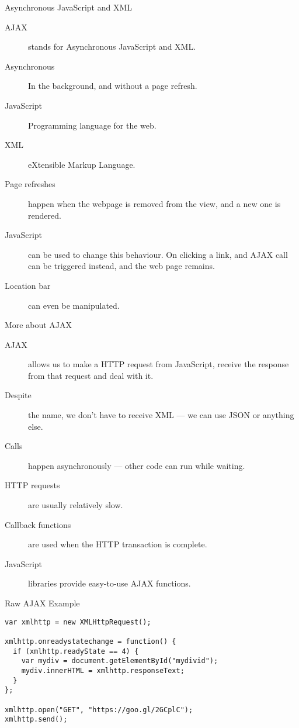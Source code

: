 \begin{frame}{Asynchronous JavaScript and XML}
  
  \begin{description}
    \item[AJAX] stands for Asynchronous JavaScript and XML.
    \item[Asynchronous] In the background, and without a page refresh.
    \item[JavaScript] Programming language for the web.
    \item[XML] eXtensible Markup Language.
    \item[Page refreshes] happen when the webpage is removed from the view, and a new one is rendered.
    \item[JavaScript] can be used to change this behaviour. On clicking a link, and AJAX call can be triggered instead, and the web page remains.
    \item[Location bar] can even be manipulated.
  \end{description}
\end{frame}


\begin{frame}{More about AJAX}
  \begin{description}
    \item[AJAX] allows us to make a HTTP request from JavaScript, receive the response from that request and deal with it.
    \item[Despite] the name, we don't have to receive XML --- we can use JSON or anything else.
    \item[Calls] happen asynchronously --- other code can run while waiting.
    \item[HTTP requests] are usually relatively slow.
    \item[Callback functions] are used when the HTTP transaction is complete.
    \item[JavaScript] libraries provide easy-to-use AJAX functions.
  \end{description}
\end{frame}


\begin{frame}[fragile]{Raw AJAX Example}
  \begin{verbatim}
var xmlhttp = new XMLHttpRequest();

xmlhttp.onreadystatechange = function() {
  if (xmlhttp.readyState == 4) {
    var mydiv = document.getElementById("mydivid");
    mydiv.innerHTML = xmlhttp.responseText;
  }
};

xmlhttp.open("GET", "https://goo.gl/2GCplC");
xmlhttp.send();
  \end{verbatim}
\end{frame}


